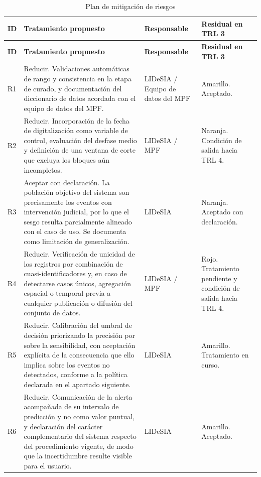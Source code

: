 \begin{longtable}[]{@{}
>{\raggedright\arraybackslash}p{}
  >{\raggedright\arraybackslash}p{}
  >{\raggedright\arraybackslash}p{}
  >{\raggedright\arraybackslash}p{}@{}}
\caption{Plan de mitigación de riesgos}
\label{tab:plan-de-mitigacion-de-riesgos}\\
\toprule\noalign{}
\textbf{ID} & \textbf{Tratamiento propuesto} & \textbf{Responsable} & \textbf{Residual en TRL 3} \\
\midrule\noalign{}
\endfirsthead
\toprule\noalign{}
\textbf{ID} & \textbf{Tratamiento propuesto} & \textbf{Responsable} & \textbf{Residual en TRL 3} \\
\midrule\noalign{}
\endhead
\bottomrule\noalign{}
\endlastfoot
R1 & Reducir. Validaciones automáticas de rango y consistencia en la etapa de curado, y documentación del diccionario de datos acordada con el equipo de datos del MPF. & LIDeSIA / Equipo de datos del MPF & Amarillo. Aceptado. \\
R2 & Reducir. Incorporación de la fecha de digitalización como variable de control, evaluación del desfase medio y definición de una ventana de corte que excluya los bloques aún incompletos. & LIDeSIA / MPF & Naranja. Condición de salida hacia TRL 4. \\
R3 & Aceptar con declaración. La población objetivo del sistema son precisamente los eventos con intervención judicial, por lo que el sesgo resulta parcialmente alineado con el caso de uso. Se documenta como limitación de generalización. & LIDeSIA & Naranja. Aceptado con declaración. \\
R4 & Reducir. Verificación de unicidad de los registros por combinación de cuasi-identificadores y, en caso de detectarse casos únicos, agregación espacial o temporal previa a cualquier publicación o difusión del conjunto de datos. & LIDeSIA / MPF & Rojo. Tratamiento pendiente y condición de salida hacia TRL 4. \\
R5 & Reducir. Calibración del umbral de decisión priorizando la precisión por sobre la sensibilidad, con aceptación explícita de la consecuencia que ello implica sobre los eventos no detectados, conforme a la política declarada en el apartado siguiente. & LIDeSIA & Amarillo. Tratamiento en curso. \\
R6 & Reducir. Comunicación de la alerta acompañada de su intervalo de predicción y no como valor puntual, y declaración del carácter complementario del sistema respecto del procedimiento vigente, de modo que la incertidumbre resulte visible para el usuario. & LIDeSIA & Amarillo. Aceptado. \\

\end{longtable}
